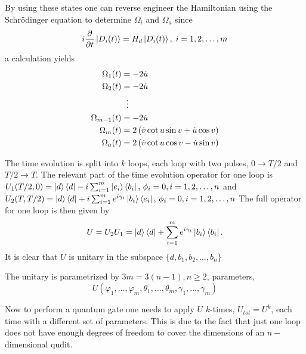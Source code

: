 By using these states one can reverse engineer the Hamiltonian using the Schrödinger equation to determine $\Omega_i$ and $\Omega_a$ since 
\begin{equation}
i\pdv{}{t}\ket{D_i(t)} = H_d\ket{D_i(t)},\; i = 1,2,\dots,m
\end{equation}
a calculation yields
\begin{equation}
\begin{aligned}
\Omega_1(t) &= -2\dot{u}
\\ 
\Omega_2(t) &= -2\dot{u}
\\
&\hspace{2mm}\vdots
\\
\Omega_{m-1}(t) &= -2\dot{u}
\\
\Omega_m(t) &= 2\left(\dot{v}\cot u\sin v + \dot{u}\cos v \right)
\\
\Omega_a(t) &= 2\left(\dot{v}\cot u\cos v - \dot{u}\sin v \right)
\end{aligned}
\end{equation}

The time evolution is split into $k$ loops, each loop with two pulses, $0 \longrightarrow T/2$ and $T/2 \longrightarrow T$. The relevant part of the time evolution operator for one loop is  
$U_1(T/2,0) = \ket{d}\bra{d} -i\sum_{i = 1}^m \ket{e_i}\bra{b_i},\, \phi_i = 0, i = 1,2,\dots,n$ and $U_2(T,T/2) = \ket{d}\bra{d} + i\sum_{i = 1}^m e^{i\gamma_i}\ket{b_i}\bra{e_i},\, \phi_i = 0, i = 1,2,\dots,n $
The full operator for one loop is then given by 
\begin{equation}
U = U_2U_1 = \ket{d}\bra{d} + \sum_{i = 1}^{m}e^{i\gamma_i}\ket{b_i}\bra{b_i}.
\end{equation}
It is clear that $U$ is unitary in the subspace $\{d,b_1,b_2,\dots,b_n\}$

The unitary is parametrized by $3m = 3(n-1), n\geq 2$, parameters,
\begin{equation}
U(\varphi_1,\dots,\varphi_m,\theta_1,\dots,\theta_m,\gamma_1,\dots,\gamma_m) 
\end{equation} 


Now to perform a quantum gate one needs to apply $U$ $k$-times, $U_{tot} = U^k$, each time with a different set of parameters. This is due to the fact that just one loop does not have enough degrees of freedom to cover the dimensions of an $n-$dimensional qudit.

